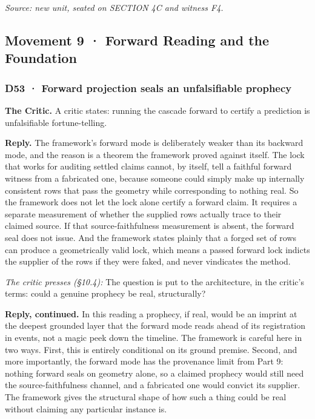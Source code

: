 \documentclass[10pt,twocolumn]{article}
\begin{document}
\emph{Source: new unit, seated on SECTION 4C and witness F4.}

\hypertarget{movement-9-forward-reading-and-the-foundation}{%
\subsection{Movement 9 · Forward Reading and the
Foundation}\label{movement-9-forward-reading-and-the-foundation}}

\hypertarget{d53-forward-projection-seals-an-unfalsifiable-prophecy}{%
\subsubsection{D53 · Forward projection seals an unfalsifiable
prophecy}\label{d53-forward-projection-seals-an-unfalsifiable-prophecy}}

\textbf{The Critic.} A critic states: running the cascade forward to
certify a prediction is unfalsifiable fortune-telling.

\textbf{Reply.} The framework's forward mode is deliberately weaker than
its backward mode, and the reason is a theorem the framework proved
against itself. The lock that works for auditing settled claims cannot,
by itself, tell a faithful forward witness from a fabricated one,
because someone could simply make up internally consistent rows that
pass the geometry while corresponding to nothing real. So the framework
does not let the lock alone certify a forward claim. It requires a
separate measurement of whether the supplied rows actually trace to
their claimed source. If that source-faithfulness measurement is absent,
the forward seal does not issue. And the framework states plainly that a
forged set of rows can produce a geometrically valid lock, which means a
passed forward lock indicts the supplier of the rows if they were faked,
and never vindicates the method.

\emph{The critic presses (§10.4):} The question is put to the
architecture, in the critic's terms: could a genuine prophecy be real,
structurally?

\textbf{Reply, continued.} In this reading a prophecy, if real, would be
an imprint at the deepest grounded layer that the forward mode reads
ahead of its registration in events, not a magic peek down the timeline.
The framework is careful here in two ways. First, this is entirely
conditional on its ground premise. Second, and more importantly, the
forward mode has the provenance limit from Part 9: nothing forward seals
on geometry alone, so a claimed prophecy would still need the
source-faithfulness channel, and a fabricated one would convict its
supplier. The framework gives the structural shape of how such a thing
could be real without claiming any particular instance is.
\end{document}
